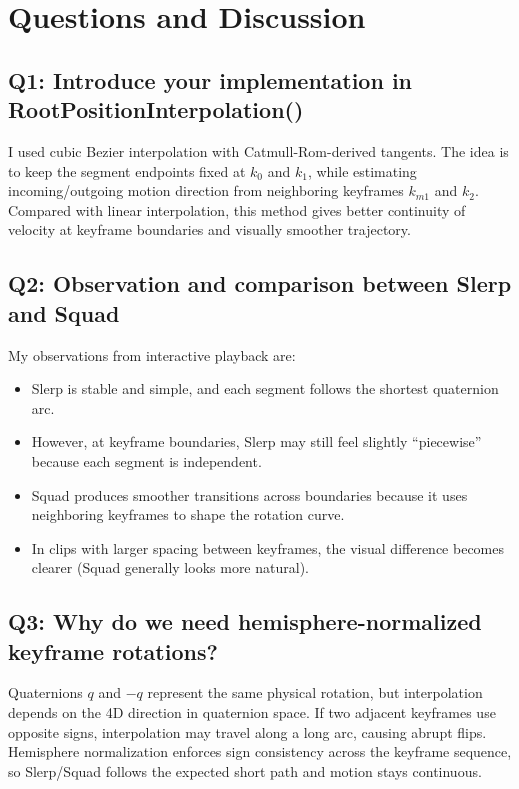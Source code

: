 \documentclass[11pt,a4paper]{article}
\begin{document}
\section{Questions and Discussion}

\subsection{Q1: Introduce your implementation in RootPositionInterpolation()}
I used cubic Bezier interpolation with Catmull-Rom-derived tangents.
The idea is to keep the segment endpoints fixed at \(k_0\) and \(k_1\), while estimating incoming/outgoing motion direction from neighboring keyframes \(k_{m1}\) and \(k_2\).
Compared with linear interpolation, this method gives better continuity of velocity at keyframe boundaries and visually smoother trajectory.

\subsection{Q2: Observation and comparison between Slerp and Squad}
My observations from interactive playback are:
\begin{itemize}
    \item Slerp is stable and simple, and each segment follows the shortest quaternion arc.
    \item However, at keyframe boundaries, Slerp may still feel slightly ``piecewise'' because each segment is independent.
    \item Squad produces smoother transitions across boundaries because it uses neighboring keyframes to shape the rotation curve.
    \item In clips with larger spacing between keyframes, the visual difference becomes clearer (Squad generally looks more natural).
\end{itemize}

\subsection{Q3: Why do we need hemisphere-normalized keyframe rotations?}
Quaternions \(q\) and \(-q\) represent the same physical rotation, but interpolation depends on the 4D direction in quaternion space.
If two adjacent keyframes use opposite signs, interpolation may travel along a long arc, causing abrupt flips.
Hemisphere normalization enforces sign consistency across the keyframe sequence, so Slerp/Squad follows the expected short path and motion stays continuous.
\end{document}
